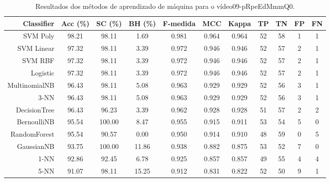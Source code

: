 \begin{table}[!htb]
\centering
\caption{Resultados dos métodos de aprendizado de máquina para o vídeo09-pRpeEdMmmQ0.}
\label{tab:09-pRpeEdMmmQ0}
\begin{tabular}{r|c|c|c|c|c|c|c|c|c|c}
\hline\hline
Classifier & Acc (\%) & SC (\%) & BH (\%) & F-medida & MCC & Kappa & TP & TN & FP & FN \\ \hline
SVM Poly & 98.21 & 98.11 & 1.69 & 0.981 & 0.964 & 0.964 & 52 & 58 & 1 & 1 \\ 
SVM Linear & 97.32 & 98.11 & 3.39 & 0.972 & 0.946 & 0.946 & 52 & 57 & 2 & 1 \\ 
SVM RBF & 97.32 & 98.11 & 3.39 & 0.972 & 0.946 & 0.946 & 52 & 57 & 2 & 1 \\ 
Logistic & 97.32 & 98.11 & 3.39 & 0.972 & 0.946 & 0.946 & 52 & 57 & 2 & 1 \\ 
MultinomialNB & 96.43 & 98.11 & 5.08 & 0.963 & 0.929 & 0.929 & 52 & 56 & 3 & 1 \\ 
3-NN & 96.43 & 98.11 & 5.08 & 0.963 & 0.929 & 0.929 & 52 & 56 & 3 & 1 \\ 
DecisionTree & 96.43 & 96.23 & 3.39 & 0.962 & 0.928 & 0.928 & 51 & 57 & 2 & 2 \\ 
BernoulliNB & 95.54 & 100.00 & 8.47 & 0.955 & 0.915 & 0.911 & 53 & 54 & 5 & 0 \\ 
RandomForest & 95.54 & 90.57 & 0.00 & 0.950 & 0.914 & 0.910 & 48 & 59 & 0 & 5 \\ 
GaussianNB & 93.75 & 100.00 & 11.86 & 0.938 & 0.882 & 0.875 & 53 & 52 & 7 & 0 \\ 
1-NN & 92.86 & 92.45 & 6.78 & 0.925 & 0.857 & 0.857 & 49 & 55 & 4 & 4 \\ 
5-NN & 91.07 & 98.11 & 15.25 & 0.912 & 0.831 & 0.822 & 52 & 50 & 9 & 1 \\ 
\hline\hline
\end{tabular}
\end{table}
